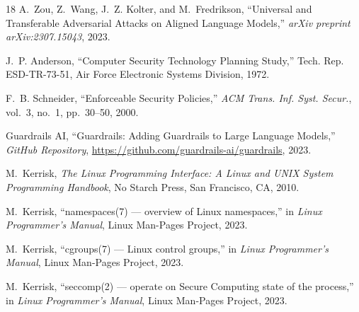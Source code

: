 \documentclass[10pt,twocolumn,letterpaper]{article}
\begin{document}
\begin{thebibliography}{18}
A.~Zou, Z.~Wang, J.~Z. Kolter, and M.~Fredrikson, ``Universal and Transferable Adversarial Attacks on Aligned Language Models,'' \emph{arXiv preprint arXiv:2307.15043}, 2023.

J.~P. Anderson, ``Computer Security Technology Planning Study,'' Tech. Rep. ESD-TR-73-51, Air Force Electronic Systems Division, 1972.

F.~B. Schneider, ``Enforceable Security Policies,'' \emph{ACM Trans. Inf. Syst. Secur.}, vol.~3, no.~1, pp.~30--50, 2000.

Guardrails AI, ``Guardrails: Adding Guardrails to Large Language Models,'' \emph{GitHub Repository}, \url{https://github.com/guardrails-ai/guardrails}, 2023.

M.~Kerrisk, \emph{The Linux Programming Interface: A Linux and UNIX System Programming Handbook}, No Starch Press, San Francisco, CA, 2010.

M.~Kerrisk, ``namespaces(7) --- overview of Linux namespaces,'' in \emph{Linux Programmer's Manual}, Linux Man-Pages Project, 2023.

M.~Kerrisk, ``cgroups(7) --- Linux control groups,'' in \emph{Linux Programmer's Manual}, Linux Man-Pages Project, 2023.

M.~Kerrisk, ``seccomp(2) --- operate on Secure Computing state of the process,'' in \emph{Linux Programmer's Manual}, Linux Man-Pages Project, 2023.

\end{thebibliography}
\end{document}
